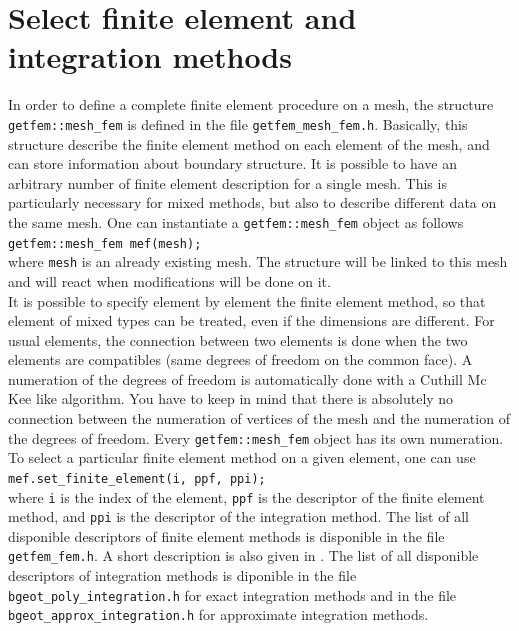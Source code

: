 \documentclass[11pt,a4paper]{article}
\begin{document}
\section{Select finite element and integration methods}

In order to define a complete finite element procedure on a mesh, the structure {\tt getfem::mesh\_fem} is defined in the file {\tt getfem\_mesh\_fem.h}. Basically, this structure describe the finite element method on each element of the mesh, and can store information about boundary structure. It is possible to have an arbitrary number of finite element description for a single mesh. This is particularly necessary for mixed methods, but also to describe different data on the same mesh. One can instantiate a {\tt getfem::mesh\_fem} object as follows\\[0.5cm]
{\tt getfem::mesh\_fem mef(mesh); }\\[0.5cm]
where {\tt mesh} is an already existing mesh. The structure will be linked to this mesh and will react when modifications will be done on it. \\[0.5cm]
It is possible to specify element by element the finite element method, so that element of mixed types can be treated, even if the dimensions are different. For usual elements, the connection between two elements is done when the two elements are compatibles (same degrees of freedom on the common face). A numeration of the degrees of freedom is automatically done with a Cuthill Mc Kee like algorithm. You have to keep in mind that there is absolutely no connection between the numeration of vertices of the mesh and the numeration of the degrees of freedom. Every {\tt getfem::mesh\_fem} object has its own numeration. \\[0.5cm]
To select a particular finite element method on a given element, one can use \\[0.5cm]
{\tt mef.set\_finite\_element(i, ppf, ppi); }\\[0.5cm]
where {\tt i} is the index of the element, {\tt ppf} is the descriptor of the finite element method, and {\tt ppi} is the descriptor of the integration method. The list of all disponible descriptors of finite element methods is disponible in the file {\tt getfem\_fem.h}. A short description is also given in \cite{BAS_COMP}. The list of all disponible descriptors of integration methods is diponible in the file {\tt bgeot\_poly\_integration.h} for exact integration methods and in the file {\tt bgeot\_approx\_integration.h} for approximate integration methods.\\[0.5cm]
\end{document}
